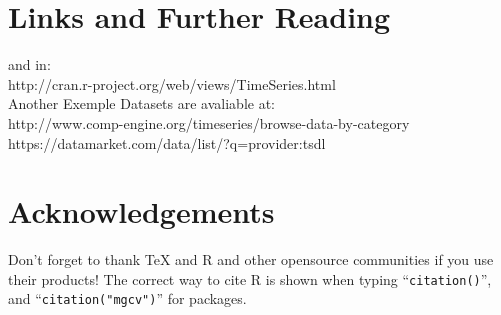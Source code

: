 \documentclass[11pt, a4paper]{article} %
\begin{document}
\section{Links and Further Reading}%
and in:\\
http://cran.r-project.org/web/views/TimeSeries.html\\
Another Exemple Datasets are avaliable at:\\
http://www.comp-engine.org/timeseries/browse-data-by-category\\
https://datamarket.com/data/list/?q=provider:tsdl\\
\section{Acknowledgements}%
Don't forget to thank TeX and R and other opensource communities if you use their products! The correct way to cite R is shown when typing ``\texttt{citation()}'', and ``\texttt{citation("mgcv")}'' for packages.
\clearpage
\end{document}

